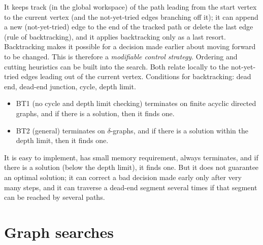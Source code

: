 \documentclass[margin=0px]{article}
\begin{document}
It keeps track (in the global workspace) of the path leading from the start vertex to the current vertex (and the not-yet-tried edges branching off it); it can append a new (not-yet-tried) edge to the end of the tracked path or delete the last edge (rule of backtracking), and it applies backtracking only as a last resort. Backtracking makes it possible for a decision made earlier about moving forward to be changed. This is therefore a \textit{modifiable control strategy}. Ordering and cutting heuristics can be built into the search. Both relate locally to the not-yet-tried edges leading out of the current vertex.
Conditions for backtracking: dead end, dead-end junction, cycle, depth limit.
\begin{itemize}
    \item BT1 (no cycle and depth limit checking) terminates on finite acyclic directed graphs, and if there is a solution, then it finds one.
    \item BT2 (general) terminates on $\delta$-graphs, and if there is a solution within the depth limit, then it finds one.
\end{itemize}
It is easy to implement, has small memory requirement, always terminates, and if there is a solution (below the depth limit), it finds one. But it does not guarantee an optimal solution; it can correct a bad decision made early only after very many steps, and it can traverse a dead-end segment several times if that segment can be reached by several paths.

\section{Graph searches}
\end{document}
